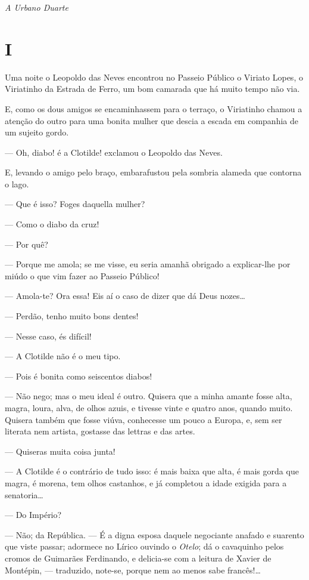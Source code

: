 
\begin{flushright}
\emph{A Urbano Duarte}
\end{flushright}

\section{I}

Uma noite o Leopoldo das Neves encontrou no Passeio Público o Viriato
Lopes, o Viriatinho da Estrada de Ferro, um bom camarada que há muito
tempo não via.

E, como os dous amigos se encaminhassem para o terraço, o Viriatinho
chamou a atenção do outro para uma bonita mulher que descia a escada em
companhia de um sujeito gordo.

--- Oh, diabo! é a Clotilde! exclamou o Leopoldo das Neves.

E, levando o amigo pelo braço, embarafustou pela sombria alameda que
contorna o lago.

--- Que é isso? Foges daquella mulher?

--- Como o diabo da cruz!

--- Por quê?

--- Porque me amola; se me visse, eu seria amanhã obrigado a
explicar-lhe por miúdo o que vim fazer ao Passeio Público!

--- Amola-te? Ora essa! Eis aí o caso de dizer que dá Deus nozes\ldots{}

--- Perdão, tenho muito bons dentes!

--- Nesse caso, és difícil!

--- A Clotilde não é o meu tipo.

--- Pois é bonita como seiscentos diabos!

--- Não nego; mas o meu ideal é outro. Quisera que a minha amante fosse
alta, magra, loura, alva, de olhos azuis, e tivesse vinte e quatro anos,
quando muito. Quisera também que fosse viúva, conhecesse um pouco a
Europa, e, sem ser literata nem artista, gostasse das lettras e das
artes.

--- Quiseras muita coisa junta!

--- A Clotilde é o contrário de tudo isso: é mais baixa que alta, é mais
gorda que magra, é morena, tem olhos castanhos, e já completou a idade
exigida para a senatoria\ldots{}

--- Do Império?

--- Não; da República. --- É a digna esposa daquele negociante anafado e
suarento que viste passar; adormece no Lírico ouvindo o \emph{Otelo}; dá
o cavaquinho pelos cromos de Guimarães Ferdinando, e delicia-se com a
leitura de Xavier de Montépin, --- traduzido, note-se, porque nem ao
menos sabe francês!\ldots{}


